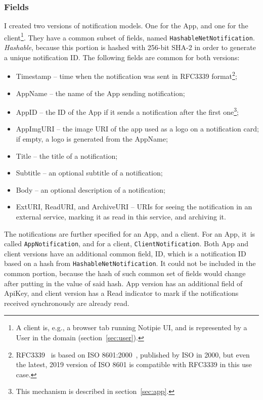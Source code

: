 \subsubsection{Fields}\label{sec:protocol-fields}

I created two versions of notification models.
One for the App,
and one for the client\footnote{
  A client is, e.g.,
  a browser tab running Notipie \ac{UI},
  and is represented
  by a User in the domain (section~\ref{sec:user}).
}.
They have a common subset of fields,
named \texttt{HashableNetNotification}.
\textit{Hashable},
because this portion is hashed with 256-bit \ac{SHA-2}
in order to generate a unique notification \ac{ID}.
The following fields are common for both versions:

\begin{itemize}
  \item Timestamp -- time when the notification was sent
        in RFC3339 format\footnote{
          RFC3339~\cite{clyne_rfc3339_2002} is based on
          ISO 8601:2000~\cite{international_organization_for_standardization_iso_2000},
          published by \ac{ISO} in 2000,
          but even the latest, 2019 version of ISO 8601
          is compatible with RFC3339 in this use case.
        };
  \item AppName -- the name of the App sending notification;
  \item AppID -- the \ac{ID} of the App
        if it sends a notification after the first one\footnote{
          This mechanism is described in section~\ref{sec:app}.
        };
  \item AppImgURI -- the image \ac{URI} of the app
        used as a logo on a notification card;
        if empty, a logo is generated from the AppName;
  \item Title -- the title of a notification;
  \item Subtitle -- an optional subtitle of a notification;
  \item Body -- an optional description of a notification;
  \item ExtURI, ReadURI, and ArchiveURI -- \acp{URI}
        for seeing the notification in an external service,
        marking it as read in this service, and archiving it.
\end{itemize}

The notifications are further specified
for an App, and a client.
For an App, it~is called \texttt{AppNotification},
and for a client, \texttt{ClientNotification}.
Both App and client versions
have an additional common field, \ac{ID},
which is a notification \ac{ID}
based on a hash from \texttt{HashableNetNotification}.
It could not be included in the common portion,
because the hash of such common set of fields
would change after putting in the value of said hash.
App version has an additional field of ApiKey,
and client version has a Read indicator
to mark if the notifications received
synchronously are already read.
